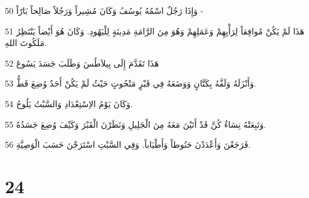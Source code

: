 \par 50 وَإِذَا رَجُلٌ اسْمُهُ يُوسُفُ وَكَانَ مُشِيراً وَرَجُلاً صَالِحاً بَارّاً -
\par 51 هَذَا لَمْ يَكُنْ مُوافِقاً لِرَأْيِهِمْ وَعَمَلِهِمْ وَهُوَ مِنَ الرَّامَةِ مَدِينَةٍ لِلْيَهُودِ. وَكَانَ هُوَ أَيْضاً يَنْتَظِرُ مَلَكُوتَ اللهِ.
\par 52 هَذَا تَقَدَّمَ إِلَى بِيلاَطُسَ وَطَلَبَ جَسَدَ يَسُوعَ
\par 53 وَأَنْزَلَهُ وَلَفَّهُ بِكَتَّانٍ وَوَضَعَهُ فِي قَبْرٍ مَنْحُوتٍ حَيْثُ لَمْ يَكُنْ أَحَدٌ وُضِعَ قَطُّ.
\par 54 وَكَانَ يَوْمُ الاِسْتِعْدَادِ وَالسَّبْتُ يَلُوحُ.
\par 55 وَتَبِعَتْهُ نِسَاءٌ كُنَّ قَدْ أَتَيْنَ مَعَهُ مِنَ الْجَلِيلِ وَنَظَرْنَ الْقَبْرَ وَكَيْفَ وُضِعَ جَسَدُهُ.
\par 56 فَرَجَعْنَ وَأَعْدَدْنَ حَنُوطاً وَأَطْيَاباً. وَفِي السَّبْتِ اسْتَرَحْنَ حَسَبَ الْوَصِيَّةِ.

\chapter{24}

